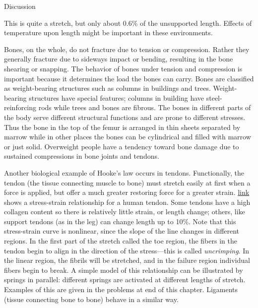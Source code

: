 \documentclass[
]{book}
\newenvironment{tinysection}{}{}
\begin{document}
\begin{tinysection}

{Discussion}

\end{tinysection}

This is quite a stretch, but only about 0.6\% of the unsupported length.
Effects of temperature upon length might be important in these
environments.

Bones, on the whole, do not fracture due to tension or compression.
Rather they generally fracture due to sideways impact or bending,
resulting in the bone shearing or snapping. The behavior of bones under
tension and compression is important because it determines the load the
bones can carry. Bones are classified as weight-bearing structures such
as columns in buildings and trees. Weight-bearing structures have
special features; columns in building have steel-reinforcing rods while
trees and bones are fibrous. The bones in different parts of the body
serve different structural functions and are prone to different
stresses. Thus the bone in the top of the femur is arranged in thin
sheets separated by marrow while in other places the bones can be
cylindrical and filled with marrow or just solid. Overweight people have
a tendency toward bone damage due to sustained compressions in bone
joints and tendons.

Another biological example of Hooke's law occurs in tendons.
Functionally, the tendon (the tissue connecting muscle to bone) must
stretch easily at first when a force is applied, but offer a much
greater restoring force for a greater strain.
\protect\hyperlink{import-auto-id1165296334455}{link} shows a
stress-strain relationship for a human tendon. Some tendons have a high
collagen content so there is relatively little strain, or length change;
others, like support tendons (as in the leg) can change length up to
10\%. Note that this stress-strain curve is nonlinear, since the slope of
the line changes in different regions. In the first part of the stretch
called the toe region, the fibers in the tendon begin to align in the
direction of the stress---this is called \emph{uncrimping}. In the linear
region, the fibrils will be stretched, and in the failure region
individual fibers begin to break. A simple model of this relationship
can be illustrated by springs in parallel: different springs are
activated at different lengths of stretch. Examples of this are given in
the problems at end of this chapter. Ligaments (tissue connecting bone
to bone) behave in a similar way.
\end{document}
